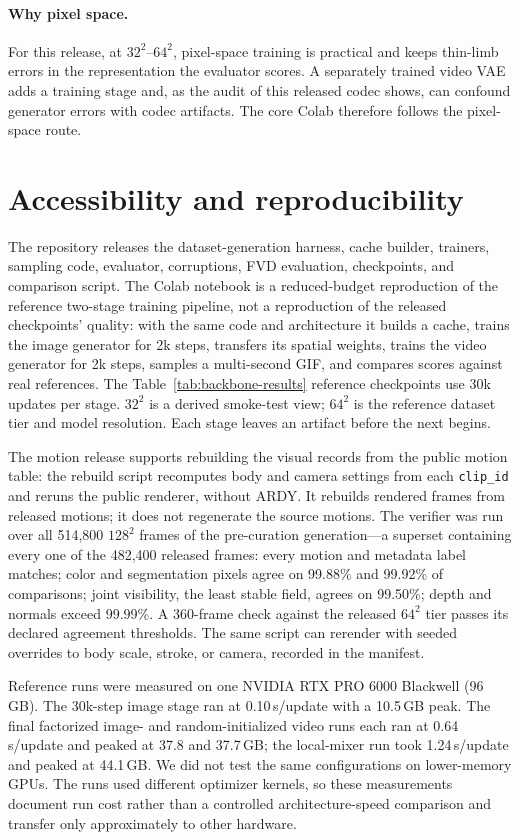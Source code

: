 \documentclass[10pt,twocolumn,letterpaper]{article}
\begin{document}
\paragraph{Why pixel space.} For this release, at $32^2$--$64^2$, pixel-space training is practical and keeps
thin-limb errors in the representation the evaluator scores. A separately trained video VAE adds a training
stage and, as the audit of this released codec shows, can confound generator errors with codec artifacts. The
core Colab therefore follows the pixel-space route.

\section{Accessibility and reproducibility}\label{sec:access}
The repository releases the dataset-generation harness, cache builder, trainers, sampling code, evaluator, corruptions, FVD
evaluation, checkpoints, and comparison script. The Colab notebook is a reduced-budget reproduction of the
reference two-stage training pipeline, not a reproduction of the released checkpoints' quality: with the same code
and architecture it builds a cache, trains the image generator for 2k steps, transfers its spatial weights,
trains the video generator for 2k steps, samples a multi-second GIF, and compares scores against real
references. The Table~\ref{tab:backbone-results} reference checkpoints use 30k updates per stage. $32^2$ is
a derived smoke-test view; $64^2$ is the reference dataset tier and model resolution. Each stage leaves an artifact before the next
begins.

The motion release supports rebuilding the visual records from the public motion table: the rebuild script
recomputes body and camera settings from each \texttt{clip\_id} and reruns the public renderer, without ARDY.
It rebuilds rendered frames from released motions; it does not regenerate the source motions. The verifier was
run over all 514,800 $128^2$ frames of the pre-curation generation---a superset containing every one of the
482,400 released frames: every motion and metadata label matches; color and segmentation
pixels agree on 99.88\% and 99.92\% of comparisons; joint visibility, the least stable field, agrees on
99.50\%; depth and normals exceed 99.99\%. A 360-frame check against the released $64^2$ tier passes its
declared agreement thresholds. The same script can rerender with seeded overrides to body scale, stroke, or
camera, recorded in the manifest.

Reference runs were measured on one NVIDIA RTX PRO 6000 Blackwell (96\,GB). The 30k-step image stage ran at
0.10\,s/update with a 10.5\,GB peak. The final factorized image- and random-initialized video runs each ran
at 0.64\,s/update and peaked at 37.8 and 37.7\,GB; the local-mixer run took 1.24\,s/update and peaked at
44.1\,GB. We did not test the same configurations on lower-memory GPUs. The runs used different optimizer
kernels, so these measurements document run cost rather than a controlled architecture-speed comparison
and transfer only approximately to other hardware.
\end{document}
